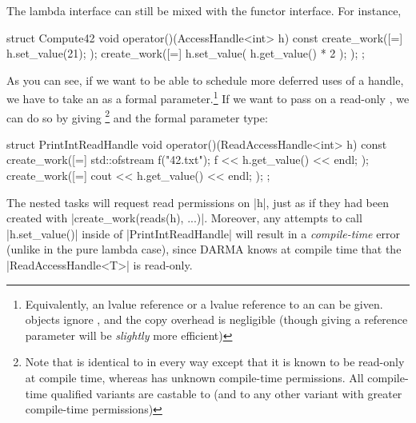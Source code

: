 The \gls{lambda} interface can still be mixed with the functor interface.  For
instance,
\begin{CppCodeNumb}
struct Compute42 {
  void operator()(AccessHandle<int> h) const {
    create_work([=]{
      h.set_value(21);
    });
    create_work([=]{
      h.set_value( h.get_value() * 2 );
    });
  }
};
\end{CppCodeNumb}
As you can see, if we want to be able to schedule more deferred uses of a
\gls{handle}, we have to take an  as a formal
parameter.\footnote{Equivalently, an lvalue reference or a 
lvalue reference to an  can be given. 
 objects ignore , and the copy
overhead is negligible (though giving a reference parameter will be {\it
slightly} more efficient)}  If we want to pass on a read-only , we
can do so by giving \footnote{Note that
 is identical to 
in every way except that it is known to be read-only at compile time, whereas
 has unknown compile-time permissions.  All
compile-time qualified  variants are castable to
 (and to any other 
variant with greater compile-time permissions)} and the formal parameter type:
\begin{CppCodeNumb}
struct PrintIntReadHandle {
  void operator()(ReadAccessHandle<int> h) const {
    create_work([=]{
      std::ofstream f("42.txt");
      f << h.get_value() << endl;
    });
    create_work([=]{
      cout << h.get_value() << endl;
    });
  }
};
\end{CppCodeNumb}
The nested \glspl{task} will request read permissions on |h|, just as if they had been
created with |create_work(reads(h), ...)|.  Moreover, any attempts to call
|h.set_value()| inside of |PrintIntReadHandle| will result in a {\it
compile-time} error (unlike in the pure \gls{lambda} case), since \gls{DARMA} knows at
compile time that the |ReadAccessHandle<T>| is read-only.  

